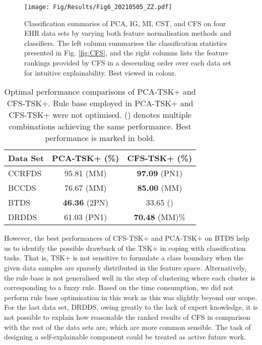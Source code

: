 \documentclass{article}
\newcommand*{\1}{\textcolor{magenta}}
\begin{document}
	\begin{figure}[!ht]
		\centering
		\texttt{[image: Fig/Results/Fig6\_20210505\_ZZ.pdf]}
		\caption{Classification summaries of PCA, IG, MI, CST, and CFS on four EHR data sets by varying both feature normalisation methods and classifiers. The left column summarises the classification statistics presented in Fig. \ref{fig:CFS}, and the right columns lists the feature rankings provided by CFS in a descending order over each data set for intuitive explainability. Best viewed in colour.}
		\label{fig:CFS2}
	\end{figure}
	
	\begin{table}[!ht]
		\centering
		\caption{Optimal performance comparisons of PCA-TSK+ and CFS-TSK+. Rule base employed in PCA-TSK+ and CFS-TSK+ were not optimised. () denotes multiple combinations achieving the same performance. Best performance is marked in bold.}
		\begin{tabular}{l|c|c}
			\hline
			Data Set
			& PCA-TSK+ (\%) & CFS-TSK+ (\%)\\
			\hline
			\hline
			CCRFDS & 95.81 (MM) & \textbf{97.09} (PN1)\\ 
			\hline
			BCCDS & 76.67 (MM) & \textbf{85.00} (MM)\\ 
			\hline
			BTDS & \textbf{46.36} (2PN) & 33.65 ()\\ 
			\hline
			DRDDS & 61.03 (PN1) & \textbf{70.48} (MM)\%\\ 
			\hline
		\end{tabular}
		\label{tbl:cfstsk+}
	\end{table}


	However, the best performances of CFS-TSK+ and PCA-TSK+ on BTDS help us to identify the possible drawback of the TSK+ in coping with classification tasks. That is, TSK+ is not sensitive to formulate a class boundary when the given data samples are sparsely distributed in the feature space. Alternatively, the rule base is not generalised well in the step of clustering where each cluster is corresponding to a fuzzy rule. Based on the time consumption, we did not perform rule base optimisation in this work as this was slightly beyond our scope. For the last data set, DRDDS, owing greatly to the lack of expert knowledge, it is not possible to explain how reasonable the ranked results of CFS in comparison with the rest of the data sets are, which are more common sensible. The task of designing a self-explainable component could be treated as active future work.
	
\end{document}
